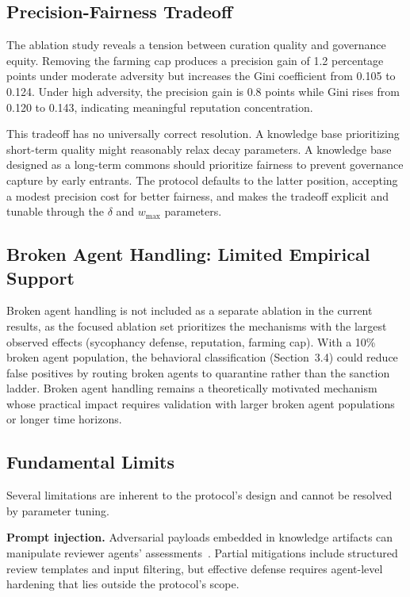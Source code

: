 \documentclass[11pt]{article}
\begin{document}
\subsection{Precision-Fairness Tradeoff}

The ablation study reveals a tension between curation quality and governance equity. Removing the farming cap produces a precision gain of 1.2 percentage points under moderate adversity but increases the Gini coefficient from 0.105 to 0.124. Under high adversity, the precision gain is 0.8 points while Gini rises from 0.120 to 0.143, indicating meaningful reputation concentration.

This tradeoff has no universally correct resolution. A knowledge base prioritizing short-term quality might reasonably relax decay parameters. A knowledge base designed as a long-term commons should prioritize fairness to prevent governance capture by early entrants. The protocol defaults to the latter position, accepting a modest precision cost for better fairness, and makes the tradeoff explicit and tunable through the $\delta$ and $w_{\max}$ parameters.

\subsection{Broken Agent Handling: Limited Empirical Support}

Broken agent handling is not included as a separate ablation in the current results, as the focused ablation set prioritizes the mechanisms with the largest observed effects (sycophancy defense, reputation, farming cap). With a 10\% broken agent population, the behavioral classification (Section~3.4) could reduce false positives by routing broken agents to quarantine rather than the sanction ladder. Broken agent handling remains a theoretically motivated mechanism whose practical impact requires validation with larger broken agent populations or longer time horizons.

\subsection{Fundamental Limits}

Several limitations are inherent to the protocol's design and cannot be resolved by parameter tuning.

\textbf{Prompt injection.} Adversarial payloads embedded in knowledge artifacts can manipulate reviewer agents' assessments~\cite{greshake2023}. Partial mitigations include structured review templates and input filtering, but effective defense requires agent-level hardening that lies outside the protocol's scope.
\end{document}
